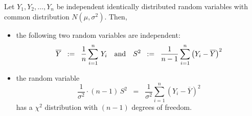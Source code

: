 \documentclass{article}
\begin{document}
\begin{theorem}
\mbox{}\vskip 0.15cm\noindent
Let $Y_{1}, Y_{2}, \ldots, Y_{n}$ be independent identically distributed random variables with common distribution $N(\mu,\sigma^{2})$.  Then,
\begin{itemize}
\item  the following two random variables are independent:
          \begin{equation*}
          \overline{Y} \;\; := \;\; \frac{1}{n}\sum^{n}_{i=1}\,Y_{i}
          \quad\textnormal{and}\quad
          S^{2} \;\; := \;\; \frac{1}{n-1}\sum^{n}_{i=1}\left(Y_{i}-\overline{Y}\right)^{2}
          \end{equation*}
\item  the random variable
          \begin{equation*}
          \dfrac{1}{\sigma^{2}}\cdot(n-1)\,S^{2} \;\; = \;\; \dfrac{1}{\sigma^{2}}\sum^{n}_{i=1}(Y_{i}-\overline{Y})^{2}
          \end{equation*}
          has a $\chi^{2}$ distribution with $(n-1)$ degrees of freedom.
\end{itemize}
\end{theorem}




%
%
%
%
%

\end{document}
